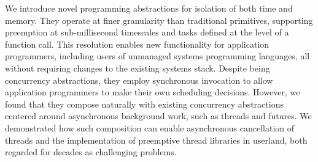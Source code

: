 We introduce novel programming abstractions for isolation of both time and memory.
They operate at finer granularity than traditional primitives, supporting preemption
at sub-millisecond timescales and tasks defined at the level of a function call.
This resolution enables new functionality for application programmers, including
users of unmanaged systems programming languages, all without requiring changes to
the existing systems stack.  Despite being concurrency abstractions, they employ
synchronous invocation to allow application programmers to make their own scheduling
decisions.  However, we found that they compose naturally with existing concurrency
abstractions centered around asynchronous background work, such as threads and
futures.  We demonstrated how such composition can enable asynchronous cancellation
of
threads and the implementation of preemptive thread libraries in userland, both
regarded for decades as challenging problems.
